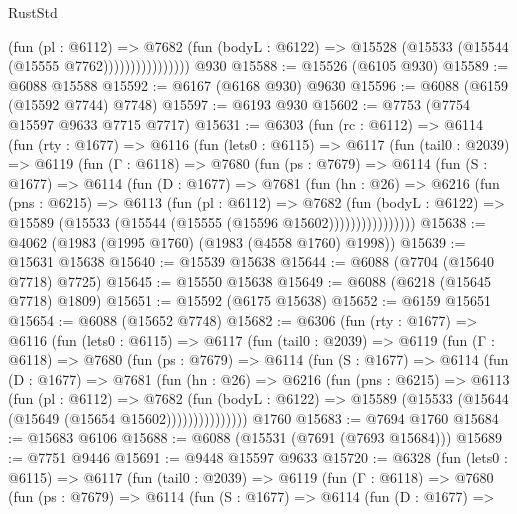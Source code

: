 \begin{lexlean}{RustStd}
\begin{coremodule}
                          (fun (pl : @6112) =>
                          @7682
                            (fun (bodyL : @6122) =>
                            @15528 (@15533 (@15544 (@15555 @7762))))))))))))))))
    @930
@15588 := @15526 (@6105 @930)
@15589 := @6088 @15588
@15592 := @6167 (@6168 @930) @9630
@15596 := @6088 (@6159 (@15592 @7744) @7748)
@15597 := @6193 @930
@15602 := @7753 (@7754 @15597 @9633 @7715 @7717)
@15631 := @6303
    (fun (rc : @6112) =>
    @6114
      (fun (rty : @1677) =>
      @6116
        (fun (lets0 : @6115) =>
        @6117
          (fun (tail0 : @2039) =>
          @6119
            (fun (Γ : @6118) =>
            @7680
              (fun (ps : @7679) =>
              @6114
                (fun (S : @1677) =>
                @6114
                  (fun (D : @1677) =>
                  @7681
                    (fun (hn : @26) =>
                    @6216
                      (fun (pns : @6215) =>
                      @6113
                        (fun (pl : @6112) =>
                        @7682
                          (fun (bodyL : @6122) =>
                          @15589 (@15533 (@15544 (@15555 (@15596 @15602))))))))))))))))
@15638 := @4062 (@1983 (@1995 @1760) (@1983 (@4558 @1760) @1998))
@15639 := @15631 @15638
@15640 := @15539 @15638
@15644 := @6088 (@7704 (@15640 @7718) @7725)
@15645 := @15550 @15638
@15649 := @6088 (@6218 (@15645 @7718) @1809)
@15651 := @15592 (@6175 @15638)
@15652 := @6159 @15651
@15654 := @6088 (@15652 @7748)
@15682 := @6306
    (fun (rty : @1677) =>
    @6116
      (fun (lets0 : @6115) =>
      @6117
        (fun (tail0 : @2039) =>
        @6119
          (fun (Γ : @6118) =>
          @7680
            (fun (ps : @7679) =>
            @6114
              (fun (S : @1677) =>
              @6114
                (fun (D : @1677) =>
                @7681
                  (fun (hn : @26) =>
                  @6216
                    (fun (pns : @6215) =>
                    @6113
                      (fun (pl : @6112) =>
                      @7682
                        (fun (bodyL : @6122) =>
                        @15589 (@15533 (@15644 (@15649 (@15654 @15602)))))))))))))))
    @1760
@15683 := @7694 @1760
@15684 := @15683 @6106
@15688 := @6088 (@15531 (@7691 (@7693 @15684)))
@15689 := @7751 @9446
@15691 := @9448 @15597 @9633
@15720 := @6328
    (fun (lets0 : @6115) =>
    @6117
      (fun (tail0 : @2039) =>
      @6119
        (fun (Γ : @6118) =>
        @7680
          (fun (ps : @7679) =>
          @6114
            (fun (S : @1677) =>
            @6114
              (fun (D : @1677) =>

\end{coremodule}
\end{lexlean}
